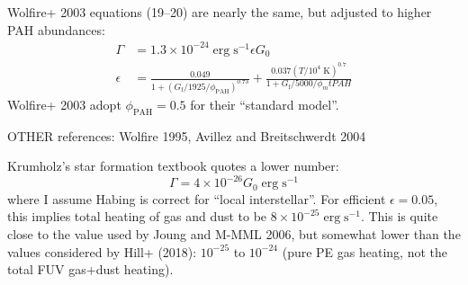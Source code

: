 \documentclass[10pt]{article}
\newcommand*{\mt}{\mathrm}
\newcommand*{\unit}[1]{\;\mt{#1}}  %
\begin{document}
Wolfire+ 2003 equations (19--20) are nearly the same, but adjusted to higher
PAH abundances:
\begin{align*}
    \Gamma &= 1.3 \times 10^{-24} \unit{erg\;s^{-1}} \epsilon G_0 \\
    \epsilon
    &= \frac{0.049}{1 + \left(G_\mt{f}/1925/\phi_\mt{PAH}\right)^{0.73}}
    + \frac{0.037 \left(T/10^4\unit{K}\right)^{0.7}}{1 + G_\mt{f}/5000/\phi_mt{PAH}}
\end{align*}
Wolfire+ 2003 adopt $\phi_\mt{PAH} = 0.5$ for their ``standard model''.

OTHER references: Wolfire 1995, Avillez and Breitschwerdt 2004

%

Krumholz's star formation textbook quotes a lower number:
\[
    \Gamma = 4 \times 10^{-26} G_0 \unit{erg\;s^{-1}}
\]
where I assume Habing is correct for ``local interstellar''.  For efficient
$\epsilon=0.05$, this implies total heating of gas and dust to be $8 \times
10^{-25} \unit{erg\;s^{-1}}$.
This is quite close to the value used by Joung and M-MML 2006, but somewhat
lower than the values considered by Hill+ (2018): $10^{-25}$ to $10^{-24}$
(pure PE gas heating, not the total FUV gas+dust heating).
\end{document}
